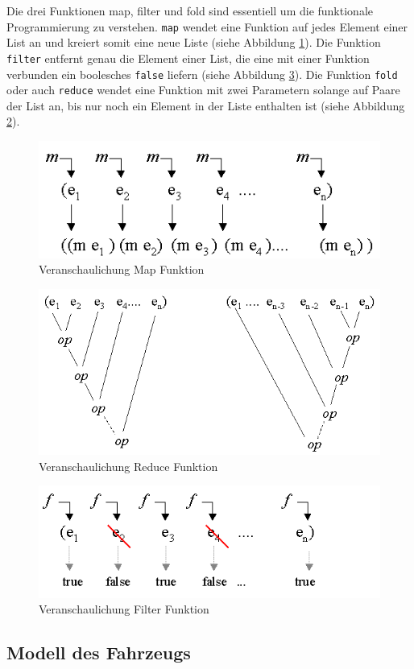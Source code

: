 \documentclass[12pt,a4paper,bibliography=totocnumbered,listof=totocnumbered, abstracton]{scrartcl}
\def\code#1{\texttt{#1}}
\theoremstyle{Umgebung}
\begin{document}
Die drei Funktionen map, filter und fold sind essentiell um die funktionale Programmierung zu verstehen. \code{map} wendet eine Funktion auf jedes Element einer List an und kreiert somit eine neue Liste (siehe Abbildung \ref{fig:map}). Die Funktion \code{filter} entfernt genau die Element einer List, die eine mit einer Funktion verbunden ein boolesches \code{false} liefern (siehe Abbildung \ref{fig:filter}). Die Funktion \code{fold} oder auch \code{reduce} wendet eine Funktion mit zwei Parametern solange auf Paare der List an, bis nur noch ein Element in der Liste enthalten ist (siehe Abbildung \ref{fig:reduce}).

\begin{figure}
	\centering
	\includegraphics[width=0.6\linewidth]{img/practical/map}
	\caption{Veranschaulichung Map Funktion}
	\label{fig:map}
\end{figure}

\begin{figure}
	\centering
	\includegraphics[width=0.6\linewidth]{img/practical/reduction}
	\caption{Veranschaulichung Reduce Funktion}
	\label{fig:reduce}
\end{figure}

\begin{figure}
	\centering
	\includegraphics[width=0.6\linewidth]{img/practical/filter}
	\caption{Veranschaulichung Filter Funktion}
	\label{fig:filter}
\end{figure}

\subsection{Modell des Fahrzeugs}
\end{document}
